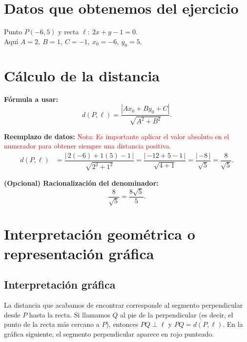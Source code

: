 \documentclass[12pt,a4paper]{article}
\begin{document}
			\section*{Datos que obtenemos del ejercicio}
			Punto \(P(-6,5)\) y recta \(\ell:\ 2x+y-1=0\).\\
			Aquí \(A=2,\ B=1,\ C=-1,\ x_0=-6,\ y_0=5\).
			
			\section*{Cálculo de la distancia}
			\textbf{Fórmula a usar:}
			\[
			d(P,\ell)=\dfrac{|Ax_0+By_0+C|}{\sqrt{A^2+B^2}}.
			\]
			
			\textbf{Reemplazo de datos:}  \textcolor{red}{Nota: Es importante aplicar el valor absoluto en el numerador para obtener siempre una distancia positiva.}
			\[
			\begin{aligned}
				d(P,\ell)
				&=\dfrac{|\,2(-6)+1(5)-1\,|}{\sqrt{2^2+1^2}}
				=\dfrac{|\,{-12}+5-1\,|}{\sqrt{4+1}}
				=\dfrac{|\,{-8}\,|}{\sqrt{5}}
				=\dfrac{8}{\sqrt{5}}.
			\end{aligned}
			\]
			
			\textbf{(Opcional) Racionalización del denominador:}
			\[
			\dfrac{8}{\sqrt{5}}=\dfrac{8\sqrt{5}}{5}.
			\]
			
			\section*{Interpretación geométrica o representación gráfica}
			\subsection*{Interpretación gráfica}
			La distancia que acabamos de encontrar corresponde al segmento perpendicular desde \(P\) hasta la recta.
			Si llamamos \(Q\) al pie de la perpendicular (es decir, el punto de la recta más cercano a \(P\)), entonces \(PQ\perp \ell\) y \(PQ=d(P,\ell)\). En la gráfica siguiente, el segmento perpendicular aparece en rojo punteado.
			
\end{document}
